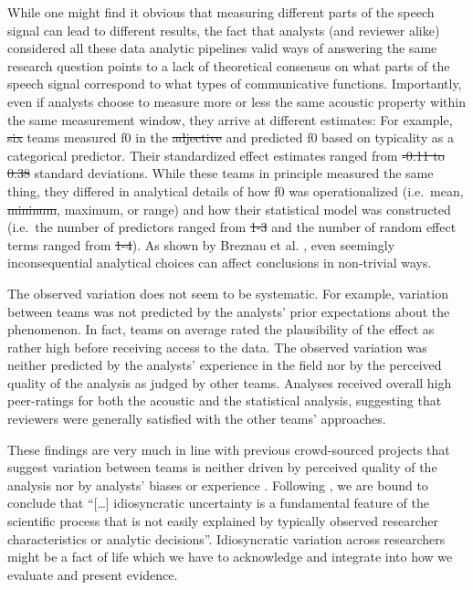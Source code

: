 \documentclass[Review,times,sageh]{sagej}
\providecommand{\DIFaddtex}[1]{{\protect\color{blue}\uwave{#1}}} %
\providecommand{\DIFdeltex}[1]{{\protect\color{red}\sout{#1}}}                      %
\providecommand{\DIFaddbegin}{} %
\providecommand{\DIFaddend}{} %
\providecommand{\DIFdelbegin}{} %
\providecommand{\DIFdelend}{} %
\providecommand{\DIFadd}[1]{\texorpdfstring{\DIFaddtex{#1}}{#1}} %
\providecommand{\DIFdel}[1]{\texorpdfstring{\DIFdeltex{#1}}{}} %
\begin{document}
While one might find it obvious that measuring different parts of the speech signal can lead to different results, the fact that analysts (and reviewer alike) considered all these data analytic pipelines valid ways of answering the same research question points to a lack of theoretical consensus on what parts of the speech signal correspond to what types of communicative functions.
Importantly, even if analysts choose to measure more or less the same acoustic property within the same measurement window, they arrive at different estimates:
For example, \DIFdelbegin \DIFdel{six }\DIFdelend \DIFaddbegin \DIFadd{five }\DIFaddend teams measured f0 in the \DIFdelbegin \DIFdel{adjective }\DIFdelend \DIFaddbegin \DIFadd{noun }\DIFaddend and predicted f0 based on typicality as a categorical predictor. Their standardized effect estimates ranged from \DIFdelbegin \DIFdel{-0.11 to 0.38 }\DIFdelend \DIFaddbegin \DIFadd{-0.35 to 0.19 }\DIFaddend standard deviations.
While these teams in principle measured the same thing, they differed in analytical details of how f0 was operationalized (i.e.~mean, \DIFdelbegin \DIFdel{mininum}\DIFdelend \DIFaddbegin \DIFadd{minimum}\DIFaddend , maximum, \DIFaddbegin \DIFadd{point }\DIFaddend or range) and how their statistical model was constructed (i.e.~the number of predictors ranged from \DIFdelbegin \DIFdel{1-3 }\DIFdelend \DIFaddbegin \DIFadd{1-2 }\DIFaddend and the number of random effect terms ranged from \DIFdelbegin \DIFdel{1-4}\DIFdelend \DIFaddbegin \DIFadd{1-10}\DIFaddend ).
As shown by Breznau et al. \citeyearpar{breznau2021observing}, even seemingly inconsequential analytical choices can affect conclusions in non-trivial ways.

The observed variation does not seem to be systematic.
For example, variation between teams was not predicted by the analysts' prior expectations about the phenomenon.
In fact, teams on average rated the plausibility of the effect as rather high before receiving access to the data.
The observed variation was neither predicted by the analysts' experience in the field nor by the perceived quality of the analysis as judged by other teams.
Analyses received overall high peer-ratings for both the acoustic and the statistical analysis, suggesting that reviewers were generally satisfied with the other teams' approaches.

These findings are very much in line with previous crowd-sourced projects that suggest variation between teams is neither driven by perceived quality of the analysis nor by analysts' biases or experience \citep[e.g.,][]{silberzahn2018many, breznau2021observing}.
Following \citet[p.~9]{breznau2021observing}, we are bound to conclude that ``{[}\ldots{]} idiosyncratic uncertainty is a fundamental feature of the scientific process that is not easily explained by typically observed researcher characteristics or analytic decisions''.
Idiosyncratic variation across researchers might be a fact of life which we have to acknowledge and integrate into how we evaluate and present evidence.
\end{document}
